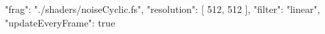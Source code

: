 {
  "frag": "./shaders/noiseCyclic.fs",
  "resolution": [
    512,
    512
  ],
  "filter": "linear",
  "updateEveryFrame": true
}
